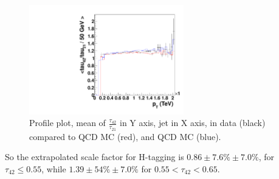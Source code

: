 \begin{figure}[htb]
\begin{center}
\includegraphics[width=0.6\textwidth,angle=0]{EXO-14-009/figs/SFExtra/tau4221PtProfile.pdf}
\end{center}
\caption{
Profile plot, mean of $\frac{\tau_{42}}{\tau_{21}}$ in Y axis, 
jet \pt in X axis, in data (black) compared to \PYTHIA QCD MC (red), and
\HERWIG QCD MC (blue).
}
\label{fig:tau42212DPtProfile}
\end{figure}


So the extrapolated scale factor for H-tagging is $0.86 \pm 7.6\% \pm 7.0\%$, 
for $\tau_{42} \leq  0.55$, while $1.39 \pm 54\% \pm 7.0\%$ for 
$0.55 < \tau_{42} <  0.65$.   


\clearpage


